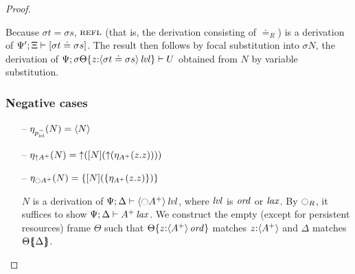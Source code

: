 \begin{proof}
\begin{itemize}
Because $\sigma{t} = \sigma{s}$, $\tunifr$ (that is, the derivation
consisting of ${\doteq}_R$) is a derivation of
$\foc{\Psi'}{\Xi}{[\sigma{t} \doteq \sigma{s}]}$.  The result then
follows by focal substitution into $\sigma{N}$, the derivation of
$\foc{\Psi}{\tackon{\sigma\Theta}{z{:}\islvl{\susp{\sigma{t} \doteq
        \sigma{s}}}}}{U}$ obtained from $N$ by variable substitution.

\end{itemize}

\subsubsection{Negative cases}

\begin{itemize}
\item[--] $\etana{N}{p^-_\mlvl} = \tetan{N}$
\item[--] $\etana{N}{{\uparrow}A^+} 
           = \tupr{([N](\tupl{(\etapa{z}{\tfocusr{z}}{A^+})}))}$



\item[--] $\etana{N}{{\ocircle}A^+} 
           = \tlaxr{[N](\tlaxl{\etapa{z}{\tfocusr{z}}{A^+}})}$
\smallskip

$N$ is a derivation of 
$\foc{\Psi}{\Delta}{\islvl{\susp{{\ocircle}A^+}}}$, where
$\mlvl$ is $\mtrue$ or $\mlax$.
By ${\ocircle}_R$, it suffices to show $\foc{\Psi}{\Delta}{\islax{A^+}}$.
We construct the empty (except for persistent resources) 
frame $\Theta$ such that 
$\tackon{\Theta}{z{:}\istrue{\susp{A^+}}}$ matches $z{:}\susp{A^+}$
and $\Delta$ matches $\frameoff{\Theta}{\Delta}$. 
\smallskip


\end{itemize}
\end{proof}
